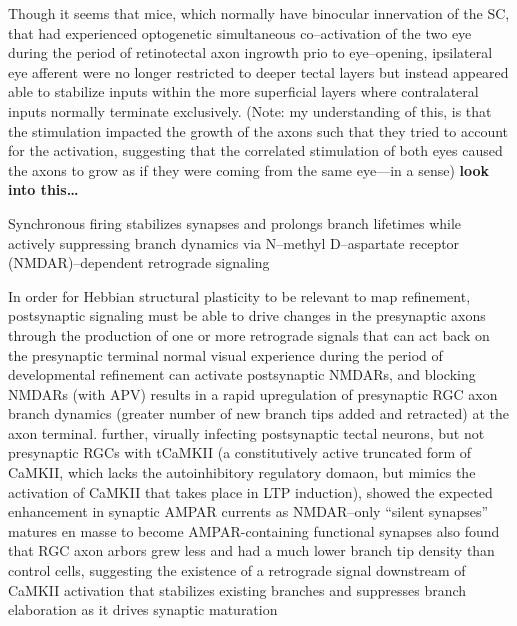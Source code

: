 \documentclass[11pt, a4paper, oneside]{article}   	%
\begin{document}
\begin{outline}
        \subsubpoint Though it seems that mice, which normally have binocular innervation of the SC, that had experienced optogenetic simultaneous co--activation of the two eye during the period of retinotectal axon ingrowth prio to eye--opening, ipsilateral eye afferent were no longer restricted to deeper tectal layers but instead appeared able to stabilize inputs within the more superficial layers where contralateral inputs normally terminate exclusively.
        \supersubpoint (Note: my understanding of this, is that the stimulation impacted the growth of the axons such that they tried to account for the activation, suggesting that the correlated stimulation of both eyes caused the axons to grow as if they were coming from the same eye---in a sense) \textbf{look into this\ldots}

    \subpoint Synchronous firing stabilizes synapses and prolongs branch lifetimes while actively suppressing branch dynamics via N--methyl D--aspartate receptor (NMDAR)--dependent retrograde signaling

        \subsubpoint In order for Hebbian structural plasticity to be relevant to map refinement, postsynaptic signaling must be able to drive changes in the presynaptic axons through the production of one or more retrograde signals that can act back on the presynaptic terminal
        \subsubpoint normal visual experience during the period of developmental refinement can activate postsynaptic NMDARs, and blocking NMDARs (with APV) results in a rapid upregulation of presynaptic RGC axon branch dynamics (greater number of new branch tips added and retracted) at the axon terminal.
        \subsubpoint further, virually infecting postsynaptic tectal neurons, but not presynaptic RGCs with tCaMKII (a constitutively active truncated form of CaMKII, which lacks the autoinhibitory regulatory domaon, but mimics the activation of CaMKII that takes place in LTP induction), showed the expected enhancement in synaptic AMPAR currents as NMDAR--only ``silent synapses'' matures en masse to become AMPAR-containing functional synapses
            \supersubpoint also found that RGC axon arbors grew less and had a much lower branch tip density than control cells, suggesting the existence of a retrograde signal downstream of CaMKII activation that stabilizes existing branches and suppresses branch elaboration as it drives synaptic maturation


\end{outline}
\end{document}
